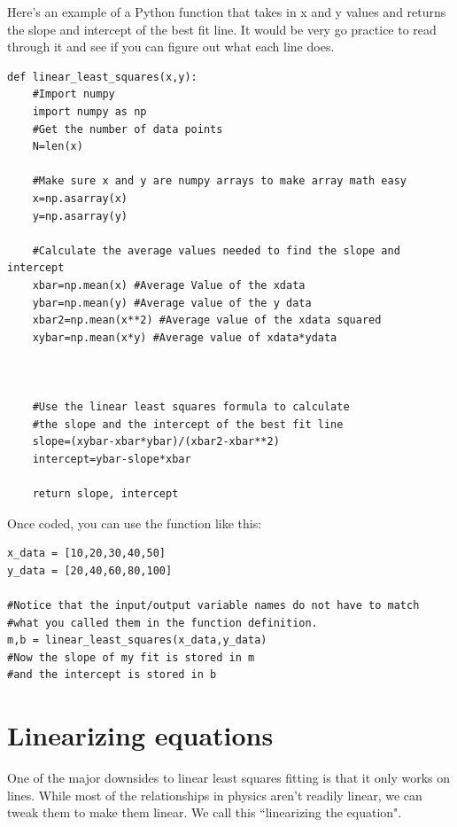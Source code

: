 \documentclass[twoside,11pt,ShortChapTitles]{BYUTextbook}
\begin{document}
Here's an example of a Python function that takes in x and y values and returns the slope and intercept of the best fit line.  It would be very go practice to read through it and see if you can figure out what each line does.
\begin{lstlisting}
def linear_least_squares(x,y):
    #Import numpy
    import numpy as np
    #Get the number of data points
    N=len(x)

    #Make sure x and y are numpy arrays to make array math easy
    x=np.asarray(x)
    y=np.asarray(y)

    #Calculate the average values needed to find the slope and intercept
    xbar=np.mean(x) #Average Value of the xdata
    ybar=np.mean(y) #Average value of the y data
    xbar2=np.mean(x**2) #Average value of the xdata squared
    xybar=np.mean(x*y) #Average value of xdata*ydata



    #Use the linear least squares formula to calculate
    #the slope and the intercept of the best fit line
    slope=(xybar-xbar*ybar)/(xbar2-xbar**2)
    intercept=ybar-slope*xbar

    return slope, intercept

\end{lstlisting}

Once coded, you can use the function like this:
\begin{lstlisting}
x_data = [10,20,30,40,50]
y_data = [20,40,60,80,100]

#Notice that the input/output variable names do not have to match
#what you called them in the function definition.
m,b = linear_least_squares(x_data,y_data)
#Now the slope of my fit is stored in m
#and the intercept is stored in b

\end{lstlisting}




\section{Linearizing equations}
One of the major downsides to linear least squares fitting is that it only works on lines.  While most of the relationships in physics aren't readily linear, we can tweak them to make them linear.  We call this ``linearizing the equation".
\end{document}
